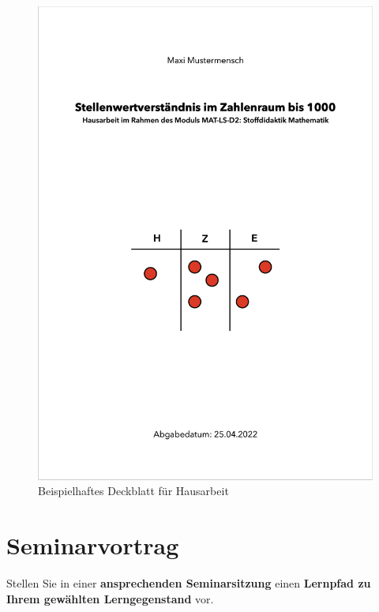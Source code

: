 \documentclass[
  ngerman,
]{scrbook}
\theoremstyle{definition}
\theoremstyle{definition}
\theoremstyle{definition}
\theoremstyle{definition}
\theoremstyle{remark}
\begin{document}
\begin{figure}

{\centering \includegraphics[width=0.5\linewidth]{pictures/F-abb-BeispielDeckblatt} 

}

\caption{Beispielhaftes Deckblatt für Hausarbeit}\label{fig:BeispielDeckblatt}
\end{figure}

\hypertarget{seminarvortrag}{%
\section{Seminarvortrag}\label{seminarvortrag}}

Stellen Sie in einer \textbf{ansprechenden Seminarsitzung} einen \textbf{Lernpfad zu Ihrem gewählten Lerngegenstand} vor.
\end{document}
